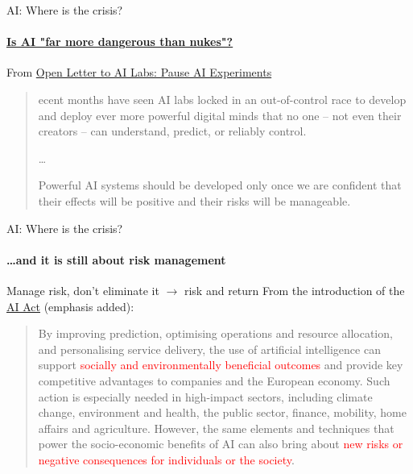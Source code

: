 \begin{frame}{AI: Where is the crisis?}
  \framesubtitle{\href{https://www.youtube.com/watch?v=5taE_br3Vr8}{Is AI "far more dangerous than nukes"?}}

From \href{https://futureoflife.org/open-letter/pause-giant-ai-experiments/}{Open Letter to AI Labs: Pause AI Experiments}\newline

\begin{quotation}
  \noindent [R]ecent months have seen AI labs locked in an out-of-control race to develop and deploy ever more powerful digital minds that no one – not even their creators – can understand, predict, or reliably control.

  \ldots

  \noindent Powerful AI systems should be developed only once we are confident that their effects will be positive and their risks will be manageable.
\end{quotation}

\end{frame}

\begin{frame}{AI: Where is the crisis?}
  \framesubtitle{\ldots and it is still about risk management}
  {\large Manage risk, don't eliminate it $\rightarrow$ risk and return}
  \newline
  \newline
  From the introduction of the \href{https://eur-lex.europa.eu/resource.html?uri=cellar:e0649735-a372-11eb-9585-01aa75ed71a1.0001.02/DOC_1&format=PDF}{AI Act} (emphasis added):
  \begin{quotation}
    \noindent By improving prediction, optimising operations and resource allocation, and personalising service delivery, the use of artificial intelligence can support \textcolor{red}{socially and environmentally beneficial outcomes} and provide key competitive advantages to companies and the European economy. Such action is especially needed in high-impact sectors, including climate change, environment and health, the public sector, finance, mobility, home affairs and agriculture. However, the same elements and techniques that power the socio-economic benefits of AI can also bring about \textcolor{red}{new risks or negative consequences for individuals or the society}.
  \end{quotation}

\end{frame}


